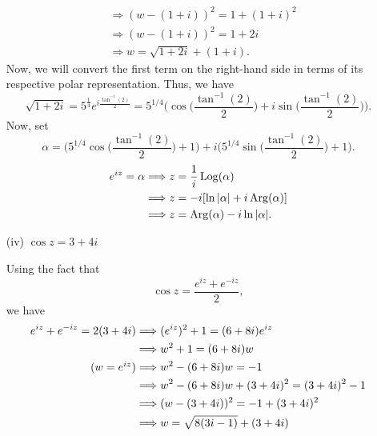 \documentclass[a4paper]{article}
\begin{document}
\begin{enumerate}
\begin{solution}
\begin{align*}
                                                     &\Longrightarrow (w - (1+i))^{2} = 1 + (1+i)^{2} \\
                                                     &\Longrightarrow (w - (1+i))^{2 } = 1 + 2i \\
                                                     &\Longrightarrow  w = \sqrt{ 1 + 2i } + (1+i). 
        \end{align*}
        Now, we will convert the first term on the right-hand side in terms of its respective polar representation. Thus, we have
        \[  \sqrt{ 1 + 2i }  = 5^{\frac{1  }{ 4 } } e^{i \frac{ \tan^{-1}(2) }{ 2 } } = 5^{1/4} \Big(  \cos \Big(  \frac{ \tan^{-1}(2) }{ 2 }  \Big) + i \sin \Big(  \frac{ \tan^{-1}(2) }{ 2 }  \Big) \Big).  \]
        Now, set 
        \[  \alpha = \Big(  5^{1/4} \cos \Big(  \frac{ \tan^{-1}(2) }{ 2 }  \Big) + 1  \Big) + i \Big(  5^{1/4} \sin \Big(  \frac{ \tan^{-1}(2) }{ 2 }  \Big) + 1  \Big). \]
        \begin{align*}
            e^{iz } = \alpha  &\Longrightarrow z = \frac{ 1 }{ i } \operatorname{Log} (\alpha)  \\
                              &\Longrightarrow z = -i [\ln | \alpha | + i \operatorname{Arg}(\alpha) ] \\ 
                              &\Longrightarrow z = \operatorname{Arg}(\alpha) - i \ln | \alpha |.
        \end{align*}
        \end{solution}
    \item[(iv)] \( \cos z = 3 + 4i \)
        \begin{solution}
        Using the fact that 
        \[  \cos z = \frac{ e^{iz} + e^{-iz} }{ 2 },  \]
        we have
        \begin{align*}
            e^{iz} + e^{-iz} = 2 (3 + 4i) &\Longrightarrow (e^{iz})^{2} + 1 = (6+8i) e^{iz}  \\
                                          &\Longrightarrow w^{2} + 1 = (6+8i)w \\ \tag{\( w = e^{iz} \)}
                                          &\Longrightarrow w^{2} - (6+8i)w = -1 \\
                                          &\Longrightarrow w^{2} - (6+8i)w + (3+4i)^{2} = (3+4i)^{2} - 1 \\
                                          &\Longrightarrow (w - (3+4i))^{2} = -1 + (3+4i)^{2} \\
                                          &\Longrightarrow w = \sqrt{ 8(3i-1) } + (3+4i)  
        \end{align*}

\end{solution}
\end{enumerate}
\end{document}
